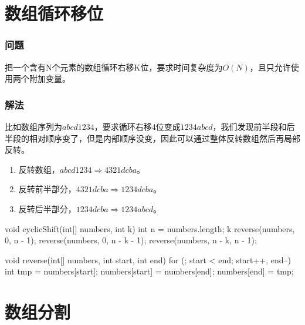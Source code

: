 \section{数组循环移位} %
\label{sec:array-cyclic-shift}

\subsubsection{问题}
把一个含有N个元素的数组循环右移K位，要求时间复杂度为$O(N)$，且只允许使用两个附加变量。

\subsubsection{解法}
比如数组序列为$abcd1234$，要求循环右移4位变成$1234abcd$，我们发现前半段和后半段的相对顺序变了，但是内部顺序没变，因此可以通过整体反转数组然后再局部反转。
\begin{enumerate}
	\item 反转数组，$abcd1234 \Longrightarrow 4321dcba$。
	\item 反转前半部分，$4321dcba \Longrightarrow 1234dcba$。
	\item 反转后半部分，$1234dcba \Longrightarrow 1234abcd$。
\end{enumerate}

\begin{Codex}[label={[$O(n)+O(1)$]Chap02_17_ArrayCyclicShift.java}]
	void cyclicShift(int[] numbers, int k) {
		int n = numbers.length;
		k %
		reverse(numbers, 0, n - 1);
		reverse(numbers, 0, n - k - 1);
		reverse(numbers, n - k, n - 1);
	}
	
	void reverse(int[] numbers, int start, int end) {
		for (; start < end; start++, end--) {
			int tmp = numbers[start];
			numbers[start] = numbers[end];
			numbers[end] = tmp;
		}
	}
\end{Codex}


\section{数组分割} %
\label{sec:split-array}

